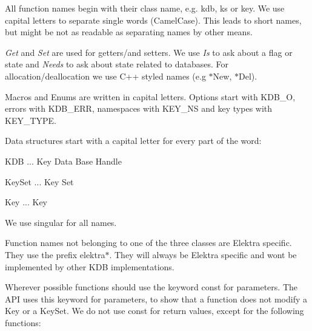 All function names begin with their class name, e.\+g. {\ttfamily kdb}, {\ttfamily ks} or {\ttfamily key}. We use capital letters to separate single words (Camel\+Case). This leads to short names, but might be not as readable as separating names by other means.

{\itshape Get} and {\itshape Set} are used for getters/and setters. We use {\itshape Is} to ask about a flag or state and {\itshape Needs} to ask about state related to databases. For allocation/deallocation we use C++ styled names (e.\+g {\ttfamily $\ast$\+New}, {\ttfamily $\ast$\+Del}).

Macros and Enums are written in capital letters. Options start with {\ttfamily K\+D\+B\+\_\+O}, errors with {\ttfamily K\+D\+B\+\_\+\+E\+RR}, namespaces with {\ttfamily K\+E\+Y\+\_\+\+NS} and key types with {\ttfamily K\+E\+Y\+\_\+\+T\+Y\+PE}.

Data structures start with a capital letter for every part of the word\+:


\begin{DoxyItemize}
\item {\ttfamily K\+DB} ... Key Data Base Handle
\item {\ttfamily Key\+Set} ... Key Set
\item {\ttfamily Key} ... Key
\end{DoxyItemize}

We use singular for all names.

Function names not belonging to one of the three classes are Elektra specific. They use the prefix {\ttfamily elektra$\ast$}. They will always be Elektra specific and won\textquotesingle{}t be implemented by other K\+DB implementations.

Wherever possible functions should use the keyword {\ttfamily const} for parameters. The A\+PI uses this keyword for parameters, to show that a function does not modify a {\ttfamily Key} or a {\ttfamily Key\+Set}. We do not use {\ttfamily const} for return values, except for the following functions\+:


